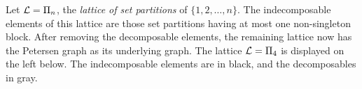 \begin{example}
\label{partition-lattice-example}
    Let $\mathcal{L}= \Pi_n$, the {\it lattice of set partitions} of $\{1,2,\ldots,n\}$. 
    The indecomposable elements of this lattice are those set partitions having at most one non-singleton block. After removing the decomposable elements, the remaining lattice now has the Petersen graph as its underlying graph.
    The lattice $\mathcal{L}=\Pi_4$ is displayed on the left below.  The indecomposable elements are in black, and the decomposables in gray.

\begin{figure}[h]  
\centering 
{}
\end{figure}
\end{example}
